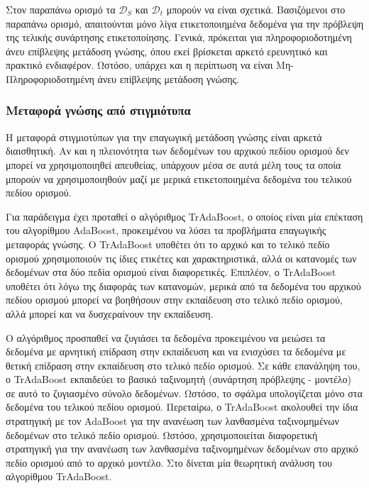 Στον παραπάνω ορισμό τα $\mathcal{D}_S$ και $\mathcal{D}_t$ μπορούν να είναι σχετικά. Βασιζόμενοι στο παραπάνω ορισμό, απαιτούνται μόνο λίγα ετικετοποιημένα δεδομένα για την πρόβλεψη της τελικής συνάρτησης ετικετοποίησης. Γενικά, πρόκειται για πληροφοριοδοτημένη άνευ επίβλεψης μετάδοση γνώσης, όπου εκεί βρίσκεται αρκετό ερευνητικό και πρακτικό ενδιαφέρον. Ωστόσο, υπάρχει και η περίπτωση να είναι Μη-Πληροφοριοδοτημένη άνευ επίβλεψης μετάδοση γνώσης.


\subsubsection{Μεταφορά γνώσης από στιγμιότυπα}
Η μεταφορά στιγμιοτύπων για την επαγωγική μετάδοση γνώσης είναι αρκετά διαισθητική. Αν και η πλειονότητα των δεδομένων του αρχικού πεδίου ορισμού δεν μπορεί να χρησιμοποιηθεί απευθείας, υπάρχουν μέσα σε αυτά μέλη τους τα οποία μπορούν να χρησιμοποιηθούν μαζί με μερικά ετικετοποιημένα δεδομένα του τελικού πεδίου ορισμού.

Για παράδειγμα έχει προταθεί ο αλγόριθμος TrAdaBoost, ο οποίος είναι μία επέκταση του αλγορίθμου AdaBoost, προκειμένου να λύσει τα προβλήματα επαγωγικής μεταφοράς γνώσης. Ο TrAdaBoost υποθέτει ότι το αρχικό και το τελικό πεδίο ορισμού χρησιμοποιούν τις ίδιες ετικέτες και χαρακτηριστικά, αλλά οι κατανομές των δεδομένων στα δύο πεδία ορισμού είναι διαφορετικές. Επιπλέον, ο TrAdaBoost υποθέτει ότι λόγω της διαφοράς των κατανομών, μερικά από τα δεδομένα του αρχικού πεδίου ορισμού μπορεί να βοηθήσουν στην εκπαίδευση στο τελικό πεδίο ορισμού, αλλά μπορεί και να δυσχεραίνουν την εκπαίδευση.

Ο αλγόριθμος προσπαθεί να ζυγιάσει τα δεδομένα προκειμένου να μειώσει τα δεδομένα με αρνητική επίδραση στην εκπαίδευση και να ενισχύσει τα δεδομένα με θετική επίδραση στην εκπαίδευση στο τελικό πεδίο ορισμού. Σε κάθε επανάληψη του, ο TrAdaBoost εκπαιδεύει το βασικό ταξινομητή (συνάρτηση πρόβλεψης - μοντέλο) σε αυτό το ζυγιασμένο σύνολο δεδομένων. Ωστόσο, το σφάλμα υπολογίζεται μόνο στα δεδομένα του τελικού πεδίου ορισμού. Περεταίρω, ο TrAdaBoost ακολουθεί την ίδια στρατηγική με τον AdaBoost για την ανανέωση των λανθασμένα ταξινομημένων δεδομένων στο τελικό πεδίο ορισμού. Ωστόσο, χρησιμοποιείται διαφορετική στρατηγική για την ανανέωση των λανθασμένα ταξινομημένων δεδομένων στο αρχικό πεδίο ορισμού από το αρχικό μοντέλο. Στο \cite{63} δίνεται μία θεωρητική ανάλυση του αλγορίθμου TrAdaBoost.

